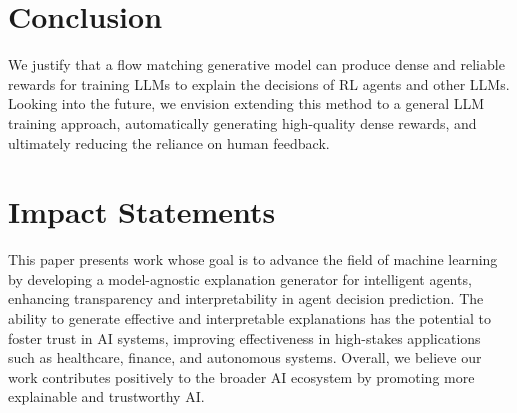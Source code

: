 \section{Conclusion}

We justify that a flow matching generative model can produce dense and reliable rewards for training LLMs to explain the decisions of RL agents and other LLMs. 
Looking into the future, we envision extending this method to a general LLM training approach, automatically generating high-quality dense rewards, and ultimately reducing the reliance on human feedback. 


\newpage
\section{Impact Statements}
This paper presents work whose goal is to advance the field of machine learning by developing a model-agnostic explanation generator for intelligent agents, enhancing transparency and interpretability in agent decision prediction. The ability to generate effective and interpretable explanations has the potential to foster trust in AI systems, improving effectiveness in high-stakes applications such as healthcare, finance, and autonomous systems. Overall, we believe our work contributes positively to the broader AI ecosystem by promoting more explainable and trustworthy AI.